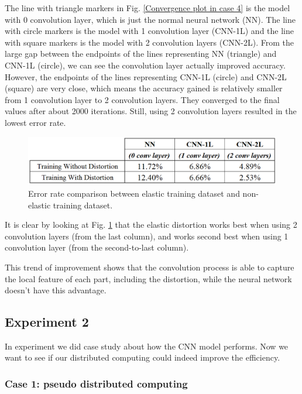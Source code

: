 The line with triangle markers in Fig. \ref{Convergence plot in case 4} is the model with 0 convolution layer, which is just the normal neural network (NN). The line with circle markers is the model with 1 convolution layer (CNN-1L) and the line with square markers is the model with 2 convolution layers (CNN-2L). From the large gap between the endpoints of the lines representing NN (triangle) and CNN-1L (circle), we can see the convolution layer actually improved accuracy. However, the endpoints of the lines representing CNN-1L (circle) and CNN-2L (square) are very close, which means the accuracy gained is relatively smaller from 1 convolution layer to 2 convolution layers. They converged to the final values after about 2000 iterations. Still, using 2 convolution layers resulted in the lowest error rate. 

\begin {figure}[t]
\centering
\includegraphics[width=0.90\columnwidth]{ResultsTbl2.png} %
\caption{Error rate comparison between elastic training dataset and non-elastic training dataset.}
\label{Error rate comparison elastic and non-elastic}
\end {figure}


It is clear by looking at Fig. \ref{Error rate comparison elastic and non-elastic} that the elastic distortion works best when using 2 convolution layers (from the last column), and works second best when using 1 convolution layer (from the second-to-last column).

This trend of improvement shows that the convolution process is able to capture the local feature of each part, including the distortion, while the neural network doesn’t have this advantage.

\subsection{Experiment 2}
\label{subsec:Exp2}

In experiment we did case study about how the CNN model performs. Now we want to see if our distributed computing could indeed improve the efficiency.

\subsubsection*{Case 1: pseudo distributed computing}

